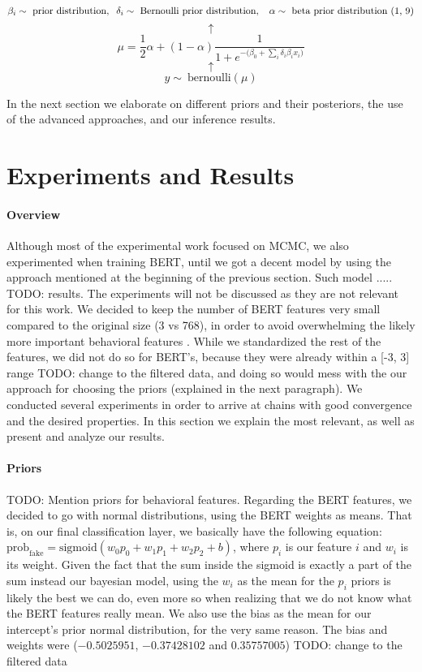 \documentclass[man, floatsintext, 10pt]{apa6}
\begin{document}
 \[\beta_i \sim \text{ prior distribution}, \hspace{2mm} \delta_i \sim \text{ Bernoulli prior distribution}, \hspace{2mm}\  \alpha \sim \text{ beta prior distribution (1, 9)} \] \[ \uparrow \] \[ \mu = \frac{1}{2} \alpha + (1 - \alpha) \frac{1}{1 + e^{-\big(\beta_0 + \sum_i \delta_i \beta_i x_i \big)}} \] \vspace{0.01mm}  \[ \uparrow \] \[ y \sim\ \text{bernoulli} (\mu) \]
 
In the next section we elaborate on different priors and their posteriors, the use of the advanced approaches, and our inference results.

\section{Experiments and Results}

\paragraph{Overview} Although most of the experimental work focused on MCMC, we also experimented when training BERT, until we got a decent model by using the approach mentioned at the beginning of the previous section. Such model ..... TODO: results. The experiments will not be discussed as they are not relevant for this work. We decided to keep the number of BERT features very small compared to the original size (3 vs 768), in order to avoid overwhelming the likely more important behavioral features . While we standardized the rest of the features, we did not do so for BERT's, because they were already within a [-3, 3] range TODO: change to the filtered data, and doing so would mess with the our approach for choosing the priors (explained in the next paragraph). We conducted several experiments in order to arrive at chains with good convergence and the desired properties. In this section we explain the most relevant, as well as present and analyze our results. 

\vspace{2mm}

\paragraph{Priors} TODO: Mention priors for behavioral features. Regarding the BERT features, we decided to go with normal distributions, using the BERT weights as means. That is, on our final classification layer, we basically have the following equation: $\text{prob}_{\text{fake}} = \text{sigmoid} (w_0 p_0 + w_1 p_1 + w_2 p_2 + b)$, where $p_i$ is our feature $i$ and $w_i$ is its weight. Given the fact that the sum inside the sigmoid is exactly a part of the sum instead our bayesian model, using the $w_i$ as the mean for the $p_i$ priors is likely the best we can do, even more so when realizing that we do not know what the BERT features really mean. We also use the bias as the mean for our intercept's prior normal distribution, for the very same reason. The bias and weights were ($-0.5025951$, $-0.37428102$ and $0.35757005$) TODO: change to the filtered data
\end{document}
